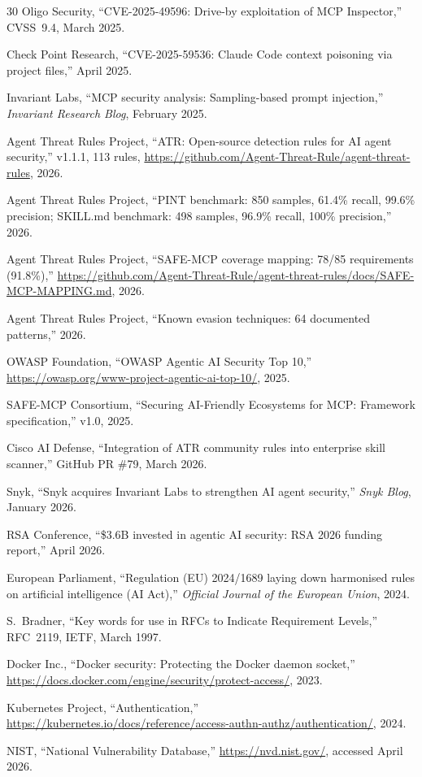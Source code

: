 \documentclass[11pt,twocolumn]{article}
\begin{document}
\begin{thebibliography}{30}
Oligo Security, ``CVE-2025-49596: Drive-by exploitation of MCP Inspector,''
CVSS~9.4, March 2025.

Check Point Research, ``CVE-2025-59536: Claude Code context poisoning via project files,''
April 2025.

Invariant Labs, ``MCP security analysis: Sampling-based prompt injection,''
\emph{Invariant Research Blog}, February 2025.

Agent Threat Rules Project, ``ATR: Open-source detection rules for AI agent security,''
v1.1.1, 113 rules, \url{https://github.com/Agent-Threat-Rule/agent-threat-rules}, 2026.

Agent Threat Rules Project, ``PINT benchmark: 850 samples, 61.4\% recall, 99.6\% precision; SKILL.md benchmark: 498 samples, 96.9\% recall, 100\% precision,'' 2026.

Agent Threat Rules Project, ``SAFE-MCP coverage mapping: 78/85 requirements (91.8\%),''
\url{https://github.com/Agent-Threat-Rule/agent-threat-rules/docs/SAFE-MCP-MAPPING.md}, 2026.

Agent Threat Rules Project, ``Known evasion techniques: 64 documented patterns,'' 2026.

OWASP Foundation, ``OWASP Agentic AI Security Top 10,''
\url{https://owasp.org/www-project-agentic-ai-top-10/}, 2025.

SAFE-MCP Consortium, ``Securing AI-Friendly Ecosystems for MCP: Framework specification,''
v1.0, 2025.

Cisco AI Defense, ``Integration of ATR community rules into enterprise skill scanner,''
GitHub PR \#79, March 2026.

Snyk, ``Snyk acquires Invariant Labs to strengthen AI agent security,''
\emph{Snyk Blog}, January 2026.

RSA Conference, ``\$3.6B invested in agentic AI security: RSA 2026 funding report,''
April 2026.

European Parliament, ``Regulation (EU) 2024/1689 laying down harmonised rules on artificial intelligence (AI Act),''
\emph{Official Journal of the European Union}, 2024.

S.~Bradner, ``Key words for use in RFCs to Indicate Requirement Levels,''
RFC~2119, IETF, March 1997.

Docker Inc., ``Docker security: Protecting the Docker daemon socket,''
\url{https://docs.docker.com/engine/security/protect-access/}, 2023.

Kubernetes Project, ``Authentication,''
\url{https://kubernetes.io/docs/reference/access-authn-authz/authentication/}, 2024.

NIST, ``National Vulnerability Database,''
\url{https://nvd.nist.gov/}, accessed April 2026.

\end{thebibliography}

\balance
\end{document}
